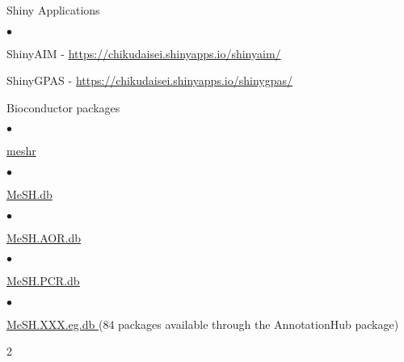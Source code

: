 \documentclass[margin,line,10pt]{res}
\newenvironment{list1}{
  \begin{list}{\ding{113}}{%
      \setlength{\itemsep}{0in}
      \setlength{\parsep}{0in} \setlength{\parskip}{0in}
      \setlength{\topsep}{0in} \setlength{\partopsep}{0in} 
      \setlength{\leftmargin}{0.17in}}}{\end{list}}
\newenvironment{list2}{
  \begin{list}{$\bullet$}{%
      \setlength{\itemsep}{0in}
      \setlength{\parsep}{0in} \setlength{\parskip}{0in}
      \setlength{\topsep}{0in} \setlength{\partopsep}{0in} 
      \setlength{\leftmargin}{0.2in}}}{\end{list}}
\begin{document}
\begin{resume}
\begin{list1}
\vspace{0.3cm}
\item[] Shiny Applications
  \begin{list2}
  \item ShinyAIM - \textcolor{blue}{\href{https://chikudaisei.shinyapps.io/shinyaim/}{https://chikudaisei.shinyapps.io/shinyaim/}}

    \vspace{0.3cm}
    
\item ShinyGPAS - \textcolor{blue}{\href{https://chikudaisei.shinyapps.io/shinygpas/}{https://chikudaisei.shinyapps.io/shinygpas/}} 
\end{list2}



\vspace{0.3cm}
\item[] Bioconductor packages
\begin{list2}
\item \textcolor{blue}{\href{http://bioconductor.org/packages/release/bioc/html/meshr.html}{meshr}}
\end{list2}
\vspace{0.3cm}
\begin{list2}
\item  \textcolor{blue}{\href{http://bioconductor.org/packages/release/data/annotation/html/MeSH.db.html}{MeSH.db}}
\end{list2}
\vspace{0.3cm}
\begin{list2}
\item \textcolor{blue}{\href{http://www.bioconductor.org/packages/release/data/annotation/html/MeSH.AOR.db.html}{MeSH.AOR.db}}
\end{list2}
\vspace{0.3cm}
\begin{list2}
\item \textcolor{blue}{\href{http://www.bioconductor.org/packages/release/data/annotation/html/MeSH.PCR.db.html}{MeSH.PCR.db}}
\end{list2}
\vspace{0.3cm}
\begin{list2}
\item \textcolor{blue}{\href{http://www.bioconductor.org/packages/release/data/annotation/}{MeSH.XXX.eg.db }} (84 packages available through the AnnotationHub package)
\end{list2}
\begin{multicols}{2}

\end{multicols}
\end{list1}
\end{resume}
\end{document}
